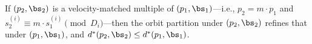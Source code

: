\begin{theorem}[Monotonicity]\label{thm:monotonicity}
If $(p_2, \bs_2)$ is a velocity-matched multiple of $(p_1, \bs_1)$---i.e., $p_2 = m \cdot p_1$ and $s_2^{(i)} \equiv m \cdot s_1^{(i)} \pmod{D_i}$---then the orbit partition under $(p_2, \bs_2)$ refines that under $(p_1, \bs_1)$, and $d^*(p_2, \bs_2) \leq d^*(p_1, \bs_1)$.
\end{theorem}
